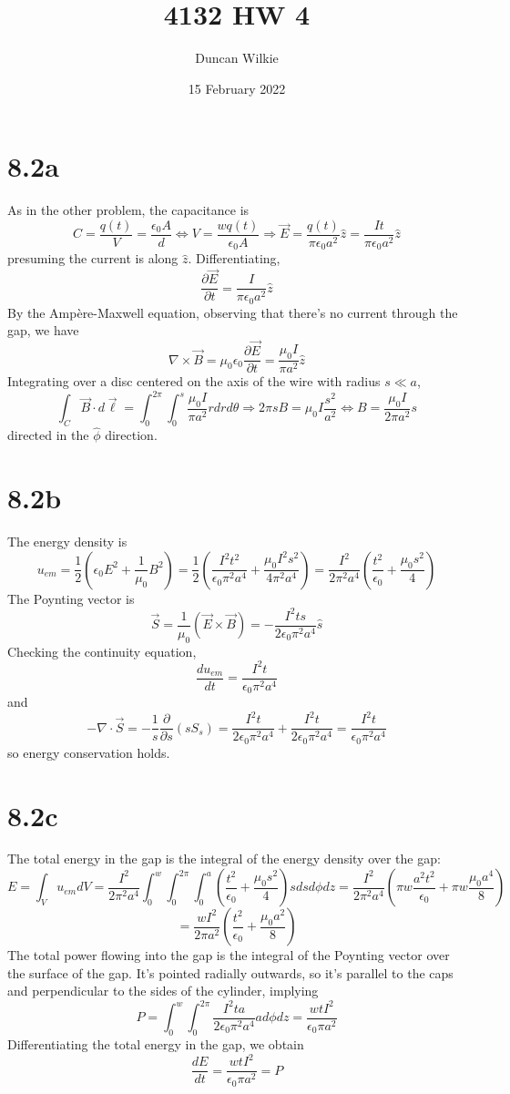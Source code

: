 \documentclass{article}
\title{4132 HW 4}
\author{Duncan Wilkie}
\date{15 February 2022}
\begin{document}
\maketitle

\section*{8.2a}
As in the other problem, the capacitance is
\[C=\frac{q(t)}{V}=\frac{\epsilon_0 A}{d}\Leftrightarrow V=\frac{wq(t)}{\epsilon_0A}\Rightarrow \vec{E}=\frac{q(t)}{\pi\epsilon_0a^2}\hat{z}=\frac{It}{\pi\epsilon_0 a^2}\hat{z}\]
presuming the current is along $\hat{z}$.
Differentiating,
\[\frac{\partial\vec{E}}{\partial t}=\frac{I}{\pi\epsilon_0 a^2}\hat{z}\]
By the Amp\`ere-Maxwell equation, observing that there's no current through the gap, we have
\[\nabla\times \vec{B}=\mu_0\epsilon_0\frac{\partial\vec{E}}{\partial t}=\frac{\mu_0I}{\pi a^2}\hat{z}\]
Integrating over a disc centered on the axis of the wire with radius $s \ll a$,
\[\int_C\vec{B}\cdot d\vec{\ell}=\int_0^{2\pi}\int_0^s \frac{\mu_0I}{\pi a^2}rdrd\theta \Rightarrow 2\pi s B=\mu_0 I \frac{s^2}{a^2} \Leftrightarrow  B = \frac{\mu_0 I}{2\pi a^2}s\]
directed in the $\hat{\phi}$ direction.

\section*{8.2b}
The energy density is
\[u_{em}=\frac{1}{2}\left( \epsilon_0E^2+\frac{1}{\mu_0}B^2 \right)=\frac{1}{2}\left( \frac{I^2t^2}{\epsilon_0\pi^2a^4}+\frac{\mu_0I^2s^2}{4\pi^2a^4} \right)=\frac{I^2}{2\pi^2a^4}\left( \frac{t^2}{\epsilon_0}+\frac{\mu_0 s^2}{4} \right)\]
The Poynting vector is
\[\vec{S}=\frac{1}{\mu_0}\left( \vec{E}\times\vec{B} \right)=-\frac{I^2ts}{2\epsilon_0\pi^2a^4}\hat{s}\]
Checking the continuity equation,
\[\frac{du_{em}}{dt}=\frac{I^{2}t}{\epsilon_{0}\pi^{2}a^{4}}\]
and
\[-\nabla\cdot \vec{S}=-\frac{1}{s}\frac{\partial}{\partial s}(sS_{s})=\frac{I^{2}t}{2\epsilon_{0}\pi^{2}a^{4}}+\frac{I^{2}t}{2\epsilon_{0}\pi^{2}a^{4}}=\frac{I^{2}t}{\epsilon_{0}\pi^{2}a^{4}}\]
so energy conservation holds.
\section*{8.2c}
The total energy in the gap is the integral of the energy density over the gap:
\[E=\int_Vu_{em}dV=\frac{I^2}{2\pi^2a^4}\int_0^w\int_0^{2\pi}\int_0^a\left( \frac{t^2}{\epsilon_0}+\frac{\mu_0 s^2}{4}\right)sdsd\phi dz=\frac{I^2}{2\pi^2a^4}\left( \pi w\frac{a^2t^2}{\epsilon_0} +\pi w\frac{\mu_0a^4}{8}\right)\]
\[=\frac{wI^2}{2\pi a^2}\left( \frac{t^2}{\epsilon_0}+\frac{\mu_0a^2}{8} \right)\]
The total power flowing into the gap is the integral of the Poynting vector over the surface of the gap. It's pointed radially outwards, so it's parallel to the caps and perpendicular to the sides of the cylinder, implying
\[P=\int_0^w\int_0^{2\pi}\frac{I^2ta}{2\epsilon_0\pi^2 a^4}ad\phi dz=\frac{wt I^2}{\epsilon_0\pi a^2}\]
Differentiating the total energy in the gap, we obtain
\[\frac{dE}{dt}=\frac{wtI^2}{\epsilon_0\pi a^2}=P\]
\end{document}
